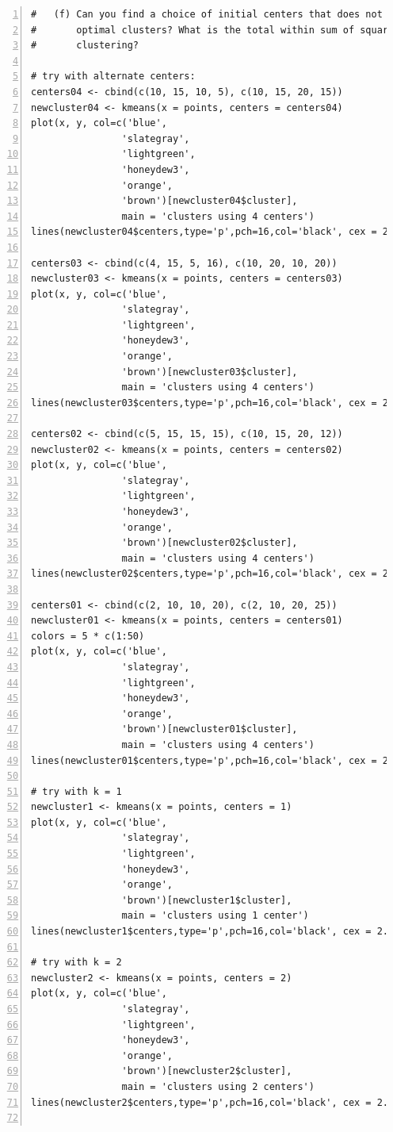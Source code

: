 \documentclass[11pt]{article}
\begin{document}
\begin{Verbatim}[numbers=left]
#   (f) Can you find a choice of initial centers that does not result in the 
#       optimal clusters? What is the total within sum of squares for that 
#       clustering? 

# try with alternate centers:
centers04 <- cbind(c(10, 15, 10, 5), c(10, 15, 20, 15))
newcluster04 <- kmeans(x = points, centers = centers04)
plot(x, y, col=c('blue',
                'slategray',
                'lightgreen',
                'honeydew3',
                'orange',
                'brown')[newcluster04$cluster],
                main = 'clusters using 4 centers')
lines(newcluster04$centers,type='p',pch=16,col='black', cex = 2.5)

centers03 <- cbind(c(4, 15, 5, 16), c(10, 20, 10, 20))
newcluster03 <- kmeans(x = points, centers = centers03)
plot(x, y, col=c('blue',
                'slategray',
                'lightgreen',
                'honeydew3',
                'orange',
                'brown')[newcluster03$cluster],
                main = 'clusters using 4 centers')
lines(newcluster03$centers,type='p',pch=16,col='black', cex = 2.5)

centers02 <- cbind(c(5, 15, 15, 15), c(10, 15, 20, 12))
newcluster02 <- kmeans(x = points, centers = centers02)
plot(x, y, col=c('blue',
                'slategray',
                'lightgreen',
                'honeydew3',
                'orange',
                'brown')[newcluster02$cluster],
                main = 'clusters using 4 centers')
lines(newcluster02$centers,type='p',pch=16,col='black', cex = 2.5)

centers01 <- cbind(c(2, 10, 10, 20), c(2, 10, 20, 25))
newcluster01 <- kmeans(x = points, centers = centers01)
colors = 5 * c(1:50)
plot(x, y, col=c('blue',
                'slategray',
                'lightgreen',
                'honeydew3',
                'orange',
                'brown')[newcluster01$cluster],
                main = 'clusters using 4 centers')
lines(newcluster01$centers,type='p',pch=16,col='black', cex = 2.5)

# try with k = 1
newcluster1 <- kmeans(x = points, centers = 1)
plot(x, y, col=c('blue',
                'slategray',
                'lightgreen',
                'honeydew3',
                'orange',
                'brown')[newcluster1$cluster],
                main = 'clusters using 1 center')
lines(newcluster1$centers,type='p',pch=16,col='black', cex = 2.5)

# try with k = 2
newcluster2 <- kmeans(x = points, centers = 2)
plot(x, y, col=c('blue',
                'slategray',
                'lightgreen',
                'honeydew3',
                'orange',
                'brown')[newcluster2$cluster],
                main = 'clusters using 2 centers')
lines(newcluster2$centers,type='p',pch=16,col='black', cex = 2.5)


\end{Verbatim}
\end{document}
